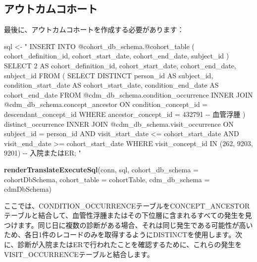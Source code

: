 \documentclass[
  11pt]{book}
\newenvironment{Shaded}{\begin{snugshade}}{\end{snugshade}}
\newcommand{\AttributeTok}[1]{\textcolor[rgb]{0.13,0.29,0.53}{#1}}
\newcommand{\FunctionTok}[1]{\textcolor[rgb]{0.13,0.29,0.53}{\textbf{#1}}}
\newcommand{\NormalTok}[1]{#1}
\newcommand{\OtherTok}[1]{\textcolor[rgb]{0.56,0.35,0.01}{#1}}
\newcommand{\StringTok}[1]{\textcolor[rgb]{0.31,0.60,0.02}{#1}}
\theoremstyle{definition}
\theoremstyle{definition}
\theoremstyle{definition}
\theoremstyle{definition}
\theoremstyle{remark}
\begin{document}
\subsection{アウトカムコホート}\label{ux30a2ux30a6ux30c8ux30abux30e0ux30b3ux30dbux30fcux30c8}

最後に、アウトカムコホートを作成する必要があります：

\begin{Shaded}
\begin{Highlighting}[]
\NormalTok{sql }\OtherTok{\textless{}{-}} \StringTok{"}
\StringTok{INSERT INTO @cohort\_db\_schema.@cohort\_table (}
\StringTok{ cohort\_definition\_id,}
\StringTok{ cohort\_start\_date,}
\StringTok{ cohort\_end\_date,}
\StringTok{subject\_id}
\StringTok{)}
\StringTok{SELECT 2 AS cohort\_definition\_id,}
\StringTok{  cohort\_start\_date,}
\StringTok{  cohort\_end\_date,}
\StringTok{  subject\_id}
\StringTok{FROM (}
\StringTok{  SELECT DISTINCT person\_id AS subject\_id,}
\StringTok{    condition\_start\_date AS cohort\_start\_date,}
\StringTok{    condition\_end\_date AS cohort\_end\_date}
\StringTok{  FROM @cdm\_db\_schema.condition\_occurrence}
\StringTok{  INNER JOIN @cdm\_db\_schema.concept\_ancestor}
\StringTok{    ON condition\_concept\_id = descendant\_concept\_id}
\StringTok{  WHERE ancestor\_concept\_id = 432791 {-}{-} 血管浮腫}
\StringTok{) distinct\_occurrence}
\StringTok{INNER JOIN @cdm\_db\_schema.visit\_occurrence}
\StringTok{  ON subject\_id = person\_id}
\StringTok{  AND visit\_start\_date \textless{}= cohort\_start\_date}
\StringTok{  AND visit\_end\_date \textgreater{}= cohort\_start\_date}
\StringTok{WHERE visit\_concept\_id IN (262, 9203,}
\StringTok{    9201) {-}{-} 入院またはER;}
\StringTok{"}

\FunctionTok{renderTranslateExecuteSql}\NormalTok{(conn, sql,}
                          \AttributeTok{cohort\_db\_schema =}\NormalTok{ cohortDbSchema,}
                          \AttributeTok{cohort\_table =}\NormalTok{ cohortTable,}
                          \AttributeTok{cdm\_db\_schema =}\NormalTok{ cdmDbSchema)}
\end{Highlighting}
\end{Shaded}

ここでは、CONDITION\_OCCURRENCEテーブルをCONCEPT\_ANCESTORテーブルと結合して、血管性浮腫またはその下位層に含まれるすべての発生を見つけます。同じ日に複数の診断がある場合、それは同じ発生である可能性が高いため、各日1件のレコードのみを取得するようにDISTINCTを使用します。次に、診断が入院またはERで行われたことを確認するために、これらの発生をVISIT\_OCCURRENCEテーブルと結合します。
\end{document}
